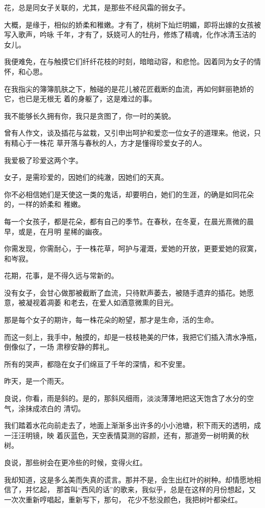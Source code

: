 \documentclass[12pt,a4paper]{article}
\def\blankrev{\vspace{1ex}}									%
\begin{document}
		花，总是同女子关联的，尤其，是那些不经风霜的弱女子。

		大概，是缘于，相似的娇柔和稚嫩。才有了，桃树下灿烂明媚，即将出嫁的女孩被写入歌声，吟咏
	千年，才有了，妖娆可人的牡丹，修炼了精魂，化作冰清玉洁的女儿。

		我便难免，在与触摸它们纤纤花枝的时刻，暗暗动容，和悲怆。因着同为女子的情怀，和心思。

		在我指尖的簿簿肌肤之下，触碰的是花儿被花匠截断的血流，再如何鲜丽艳娇的它，也已是无根无
	着的身躯了，这是难过的事。

		我不能够长久拥有你，我只是贪图了，你一时的美貌。


		\blankrev
		曾有人作文，谈及插花与盆栽，又引申出呵护和爱恋一位女子的道理来。他说，只有精心于一株花
	草开落与春秋的人，方才是懂得珍爱女子的人。

		我爱极了珍爱这两个字。

		女子，是需珍爱的，因她们的纯澈，因她们的天真。

		你不必相信她们是天使这一类的鬼话，却要明白，她们的生涯，的确是如同花朵的，一样的娇柔和
	稚嫩。

		每一个女孩子，都是花朵，都有自己的季节。在春秋，在冬夏，在晨光熹微的晨早，或是，在月明
	星稀的幽夜。

		你需发现，你需耐心，于一株花草，呵护与灌溉，爱她的开放，更要爱她的寂寞，和岑寂。

		花期，花事，是不得久远与常新的。

		没有女子，会甘心做那被截断了血流，只待默声萎去，被随手遗弃的插花。她愿意，被凝视着凋萎
	和老去，在爱人如酒意微熏的目光。

		那是每个女子的期许，每一株花朵的盼望，那才是生命，活的生命。

		而这一刻上，我手中，触摸的，却是一枝枝艳美的尸体，我把它们插入清水净瓶，倒像似了，一场
	肃穆安静的葬礼。

		所有的哭声，都隐在女子们绵亘了千年的深情，和不安里。

		\blankrev
		昨天，是一个雨天。

		良说，你看，雨是斜的。是的，那斜风细雨，淡淡薄薄地把这天饱含了水分的空气，涂抹成浓白的
	清切。

		我们踏着水花向前走去了，地面上渐渐多出许多的小小池塘，积下雨天的透明，成一汪汪明镜，映
	着灰蓝色，天空表情莫测的容颜，还有，那道旁一树明黄的秋树。

		良说，那些树会在更冷些的时候，变得火红。

		我却知道，这是多么美而失真的谎言。那并不是，会生出红叶的树种。却情愿地相信了，并忆起，
	那首叫“西风的话”的歌来，我似乎，总是在这样的月份想起，又一次次重新哼唱起，重新写下，那句，
	花少不愁没颜色，我把树叶都染红。
\end{document}
